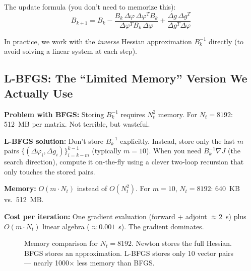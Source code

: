 \documentclass[12pt,a4paper]{article}
\begin{document}
The update formula (you don't need to memorize this):
\begin{equation}
B_{k+1} = B_k - \frac{B_k\,\Delta\varphi\,\Delta\varphi^T\!B_k}{\Delta\varphi^T\!B_k\,\Delta\varphi} + \frac{\Delta g\,\Delta g^T}{\Delta g^T\Delta\varphi}
\end{equation}

In practice, we work with the \emph{inverse} Hessian approximation $B_k^{-1}$ directly (to avoid solving a linear system at each step).

\subsection{L-BFGS: The ``Limited Memory'' Version We Actually Use}

\textbf{Problem with BFGS:} Storing $B_k^{-1}$ requires $N_t^2$ memory. For $N_t = 8192$: 512~MB per matrix. Not terrible, but wasteful.

\textbf{L-BFGS solution:} Don't store $B_k^{-1}$ explicitly. Instead, store only the last $m$ pairs $\{(\Delta\varphi_i, \Delta g_i)\}_{i=k-m}^{k-1}$ (typically $m = 10$). When you need $B_k^{-1}\nabla J$ (the search direction), compute it on-the-fly using a clever two-loop recursion that only touches the stored pairs.

\textbf{Memory:} $O(m \cdot N_t)$ instead of $O(N_t^2)$. For $m = 10$, $N_t = 8192$: 640~KB vs.\ 512~MB.

\textbf{Cost per iteration:} One gradient evaluation (forward + adjoint $\approx 2$~s) plus $O(m \cdot N_t)$ linear algebra ($\approx 0.001$~s). The gradient dominates.

\begin{figure}[H]
\centering
{}
\caption{Memory comparison for $N_t = 8192$. Newton stores the full Hessian. BFGS stores an approximation. L-BFGS stores only 10 vector pairs --- nearly 1000$\times$ less memory than BFGS.}
\label{fig:memory}
\end{figure}
\end{document}
